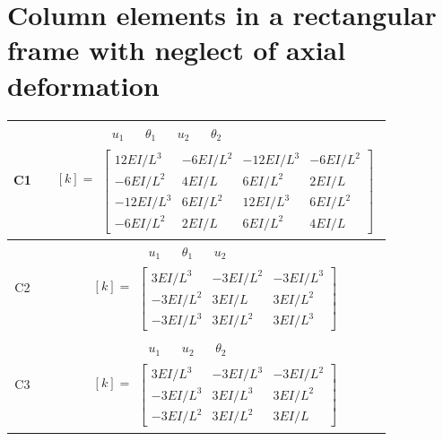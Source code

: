 \section{Column elements in a rectangular frame with neglect of axial deformation}
\begin{center}
  \renewcommand{\arraystretch}{1.3}
  \begin{tabular}{|c|c|c|}\hline
    C1 &  &
      $[k] = \begin{array}{c}\begin{array}{cccc}\ \ u_1\ \ & \ \ \theta_1\ \ & \ \ u_2\ \ & \ \ \theta_2\ \ \end{array}\\
      \left[\begin{array}{cccc} 12EI/L^3 & -6EI/L^2 & -12EI/L^3 & -6EI/L^2\\ -6EI/L^2 & 4EI/L & 6EI/L^2 & 2EI/L\\ -12EI/L^3 & 6EI/L^2 & 12EI/L^3 & 6EI/L^2\\ -6EI/L^2 & 2EI/L & 6EI/L^2 & 4EI/L\end{array}\right]\end{array}$\\\hline
    C2 &  &
      $[k] = \begin{array}{c}\begin{array}{ccc}\ \ u_1\ \ & \ \ \theta_1\ \ & \ \ u_2\ \ \end{array}\\
      \left[\begin{array}{ccc} 3EI/L^3 & -3EI/L^2 & -3EI/L^3\\ -3EI/L^2 & 3EI/L & 3EI/L^2\\ -3EI/L^3 & 3EI/L^2 & 3EI/L^3\end{array}\right]\end{array}$\\\hline
    C3 &  &
      $[k] = \begin{array}{c}\begin{array}{ccc}\ \ u_1\ \ & \ \ u_2\ \ & \ \ \theta_2\ \ \end{array}\\
      \left[\begin{array}{ccc} 3EI/L^3 & -3EI/L^3 & -3EI/L^2\\ -3EI/L^3 & 3EI/L^3 & 3EI/L^2\\ -3EI/L^2 & 3EI/L^2 & 3EI/L\end{array}\right]\end{array}$\\\hline
  \end{tabular}
\end{center}


